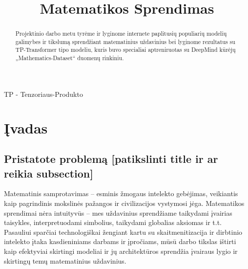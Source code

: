 \documentclass[conference]{IEEEtran}
\begin{document}
\title{Matematikos Sprendimas}

\author{
\and
{}
\and
{}
}

\maketitle

\begin{abstract}
Projektinio darbo metu tyrėme ir lyginome internete paplitusių populiarių modelių
galimybes ir tikslumą sprendžiant matematinius uždavinius bei lyginome rezultatus su
TP-Transformer tipo modeliu, kuris buvo specialiai aptreniruotas su DeepMind kūrėjų
„Mathematics-Dataset“ duomenų rinkiniu.
\end{abstract}

\begin{IEEEkeywords}
TP - Tenzoriaus-Produkto
\end{IEEEkeywords}

\section{Įvadas}
\subsection{Pristatote problemą [patikslinti title ir ar reikia subsection]}
Matematinis samprotavimas – esminis žmogaus intelekto gebėjimas, veikiantis kaip pagrindinis mokslinės pažangos ir civilizacijos vystymosi jėga. Matematikos sprendimai nėra intuityvūs – mes uždavinius sprendžiame taikydami įvairias taisykles, interpretuodami simbolius, taikydami globalias aksiomas ir t.t. Pasauliui sparčiai technologiškai žengiant kartu su skaitmenitizacija ir dirbtinio intelekto įtaka kasdieniniams darbams ir įpročiams, mūsū darbo tikslas ištirti kaip efektyviai skirtingi modeliai ir jų architektūros sprendžia įvairaus lygio ir skirtingų temų matematinius uždavinius.
\end{document}
